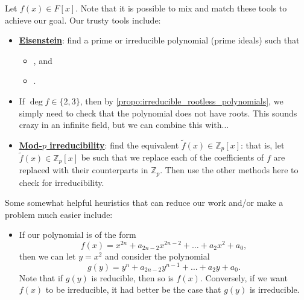 \documentclass[notoc,notitlepage]{tufte-book}
\begin{document}
Let $f(x) \in F[x]$. Note that it is possible to mix and match these tools to
achieve our goal. Our trusty tools include:
\begin{itemize}
  \item \textbf{\hyperref[propo:eisenstein_s_criterion]{Eisenstein}}: find a
    prime or irreducible polynomial (prime ideals) such that
    \begin{itemize}
      \item {}, and
      \item {}.
    \end{itemize}

  \item If $\deg f \in \{ 2, 3 \}$, then by
    \cref{propo:irreducible_rootless_polynomials}, we simply need to check that
    the polynomial does not have roots. This sounds crazy in an infinite field,
    but we can combine this with...

  \item \textbf{\hyperref[propo:mod_p_irreducibility_test]{Mod-$p$
    irreducibility}}: find the equivalent $\tilde{f}(x) \in \mathbb{Z}_p[x]$:
    that is, let $\tilde{f}(x) \in \mathbb{Z}_p[x]$ be such that we replace each
    of the coefficients of $f$ are replaced with their counterparts in
    $\mathbb{Z}_p$. Then use the other methods here to check for irreducibility.
\end{itemize}

Some somewhat helpful heuristics that can reduce our work and/or make a problem
much easier include:
\begin{itemize}
  \item If our polynomial is of the form
    \begin{equation*}
      f(x) = x^{2n} + a_{2n-2}x^{2n-2} + \hdots + a_{2}x^2 + a_0,
    \end{equation*}
    then we can let $y = x^2$ and consider the polynomial
    \begin{equation*}
      g(y) = y^n + a_{2n-2}y^{n-1} + \hdots + a_2y + a_0.
    \end{equation*}
    Note that if $g(y)$ is reducible, then so is $f(x)$. Conversely, if we want
    $f(x)$ to be irreducible, it had better be the case that $g(y)$ is
    irreducible.
\end{itemize}
\end{document}
